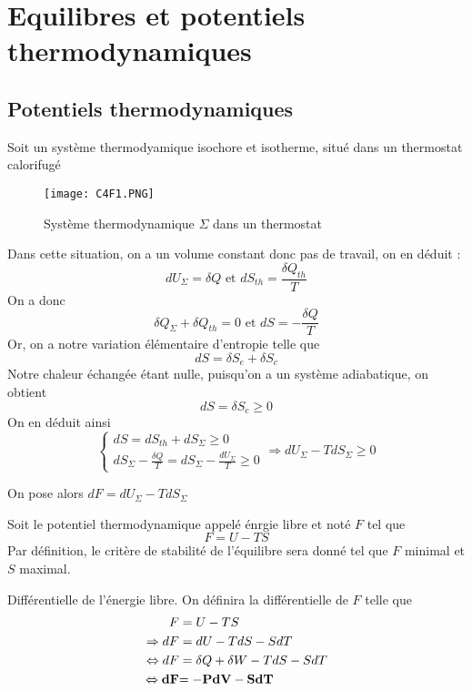 
\chapter{Equilibres  et  potentiels  thermodynamiques}

\section{Potentiels thermodynamiques}

Soit un système thermodyamique isochore et isotherme, situé dans un thermostat calorifugé 

\begin{figure}[H]
\centering
\texttt{[image: C4F1.PNG]}
\caption{Système thermodynamique $\Sigma$ dans un thermostat}
\end{figure}

Dans cette situation, on a un volume constant donc pas de travail, on en déduit :
$$dU_{\Sigma}=\delta Q \textrm{ et } dS_{th}=\frac{\delta Q_{th}}{T}$$
On a donc
$$\delta Q_{\Sigma}+\delta Q_{th}=0 \textrm{ et } dS=-\frac{\delta Q}{T}$$
Or, on a notre variation élémentaire d'entropie telle que
$$dS=\delta S_e+\delta S_c$$
Notre chaleur échangée étant nulle, puisqu'on a un système adiabatique, on obtient
$$dS=\delta S_c \geq 0$$
On en déduit ainsi
\begin{equation*}
\left \{ \begin{array}{l} dS = dS_{th}+dS_{\Sigma} \geq 0 \\dS_{\Sigma} - \frac{\delta Q}{T}=dS_{\Sigma} - \frac{dU_{\Sigma}}{T}\geq 0 \end{array} \right. \Rightarrow dU_{\Sigma}-TdS_{\Sigma}\geq 0
\end{equation*}

On pose alors $dF=dU_{\Sigma}-TdS_{\Sigma}$

\begin{definition}
Soit le potentiel thermodynamique appelé énrgie libre et noté $F$ tel que 
\begin{equation}
F=U-TS
\end{equation}
Par définition, le critère de stabilité de l'équilibre sera donné tel que $F$ minimal et $S$ maximal.
\end{definition}

\begin{proposition}{Différentielle de l'énergie libre.  }
On définira la différentielle de $F$ telle que 
\begin{align}
F&=U-TS\notag\\
\Rightarrow dF &= dU-TdS-SdT\notag\\
\Leftrightarrow dF &= \delta Q + \delta W -TdS -SdT\notag\\
\Leftrightarrow \bf{dF }&\bf{=-PdV -SdT}
\end{align}

\end{proposition}

